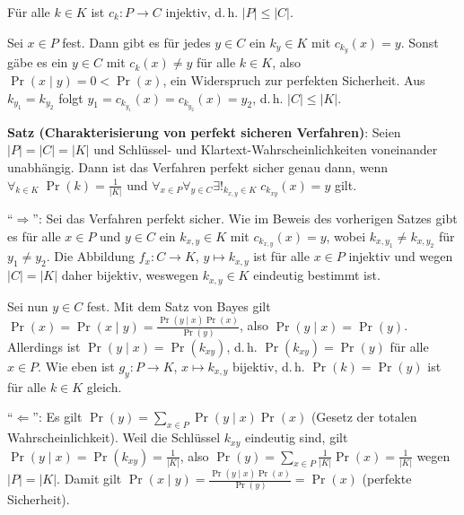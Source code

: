 \begin{Beweis}
    Für alle $k \in K$ ist $c_k\colon P \rightarrow C$ injektiv, d.\,h. $|P| \le |C|$.
    
    Sei $x \in P$ fest.
    Dann gibt es für jedes $y \in C$ ein $k_y \in K$ mit $c_{k_y}(x) = y$.
    Sonst gäbe es ein $y \in C$ mit $c_k(x) \not= y$ für alle $k \in K$,
    also $\Pr(x \;|\; y) = 0 < \Pr(x)$, ein Widerspruch zur perfekten Sicherheit.
    Aus $k_{y_1} = k_{y_2}$ folgt $y_1 = c_{k_{y_1}}(x) = c_{k_{y_2}}(x) = y_2$,
    d.\,h. $|C| \le |K|$.
\end{Beweis}

\linie

\textbf{Satz (Charakterisierung von perfekt sicheren Verfahren)}:
Seien  $|P| = |C| = |K|$ und Schlüssel- und Klartext-Wahrscheinlichkeiten voneinander unabhängig.
Dann ist das Verfahren perfekt sicher genau dann, wenn
$\forall_{k \in K}\; \Pr(k) = \frac{1}{|K|}$ und
$\forall_{x \in P} \forall_{y \in C} \exists!_{k_{x,y} \in K}\; c_{k_{xy}}(x) = y$ gilt.

\begin{Beweis}
    "`$\Rightarrow$"':
    Sei das Verfahren perfekt sicher.
    Wie im Beweis des vorherigen Satzes gibt es für alle $x \in P$ und $y \in C$ ein
    $k_{x,y} \in K$ mit $c_{k_{x,y}}(x) = y$,
    wobei $k_{x,y_1} \not= k_{x,y_2}$ für $y_1 \not= y_2$.
    Die Abbildung $f_x\colon C \rightarrow K$, $y \mapsto k_{x,y}$ ist für alle $x \in P$
    injektiv und wegen $|C| = |K|$ daher bijektiv, weswegen $k_{x,y} \in K$ eindeutig bestimmt ist.
    
    Sei nun $y \in C$ fest.
    Mit dem Satz von Bayes gilt $\Pr(x) = \Pr(x \;|\; y) = \frac{\Pr(y \;|\; x) \Pr(x)}{\Pr(y)}$,
    also $\Pr(y \;|\; x) = \Pr(y)$.
    Allerdings ist $\Pr(y \;|\; x) = \Pr(k_{xy})$, d.\,h.
    $\Pr(k_{xy}) = \Pr(y)$ für alle $x \in P$.
    Wie eben ist $g_y\colon P \rightarrow K$, $x \mapsto k_{x,y}$ bijektiv, d.\,h.
    $\Pr(k) = \Pr(y)$ ist für alle $k \in K$ gleich.
    
    "`$\Leftarrow$"':
    Es gilt $\Pr(y) = \sum_{x \in P} \Pr(y \;|\; x) \Pr(x)$
    (Gesetz der totalen Wahrscheinlichkeit).
    Weil die Schlüssel $k_{xy}$ eindeutig sind, gilt
    $\Pr(y \;|\; x) = \Pr(k_{xy}) = \frac{1}{|K|}$, also
    $\Pr(y) = \sum_{x \in P} \frac{1}{|K|} \Pr(x) = \frac{1}{|K|}$ wegen $|P| = |K|$.
    Damit gilt $\Pr(x \;|\; y) = \frac{\Pr(y \;|\; x) \Pr(x)}{\Pr(y)} = \Pr(x)$
    (perfekte Sicherheit).
\end{Beweis}

